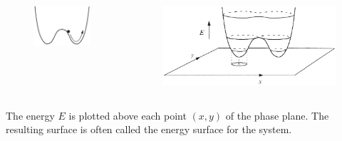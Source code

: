 \documentclass[9pt,aspectratio=43,mathserif,table]{beamer}
\begin{document}
\begin{frame}

	\begin{columns}
		\begin{column}{0.3\textwidth}
			\begin{figure}
				\centering
				\includegraphics[width=\linewidth]{fig652.png}
			\end{figure}
		\end{column}
		\begin{column}{0.7\textwidth}  %
			\begin{figure}
				\centering
				\includegraphics[width=\linewidth]{fig653.png}
			\end{figure}
		\end{column}
	\end{columns}

	The energy $E$ is plotted above each point $( x, y )$ of the phase plane. The resulting surface is often called the energy surface for the system.
\end{frame}
\end{document}
